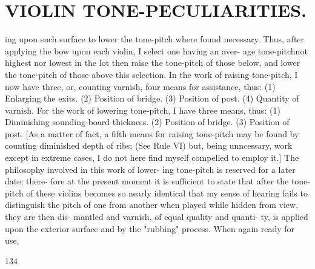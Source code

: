\documentclass{article}
\begin{document}
\section*{VIOLIN TONE-PECULIARITIES.}
ing upon such surface to lower the tone-pitch where found necessary. Thus, after applying the bow upon each violin, I select one having an aver- age tone-pitchnot highest nor lowest in the lot then raise the tone-pitch of those below, and lower the tone-pitch of those above this selection. In the work of raising tone-pitch, I now have three, or, counting varnish, four means for assistance, thus: (1) Enlarging the exits. (2) Position of bridge. (3) Position of post. (4) Quantity of varnish. For the work of lowering tone-pitch, I have three means, thus: (1) Diminishing sounding-board thickness. (2) Position of bridge. (3) Position of post. [As a matter of fact, a fifth means for raising tone-pitch may be found by counting diminished depth of ribs; (See Rule VI) but, being unncessary, work except in extreme cases, I do not here find myself compelled to employ it.] The philosophy involved in this work of lower- ing tone-pitch is reserved for a later date; there- fore at the present moment it is sufficient to state that after the tone-pitch of these violins becomes so nearly identical that my sense of hearing fails to distinguish the pitch of one from another when played while hidden from view, they are then dis- mantled and varnish, of equal quality and quanti- ty, is applied upon the exterior surface and by the "rubbing" process. When again ready for use,

134
\end{document}
